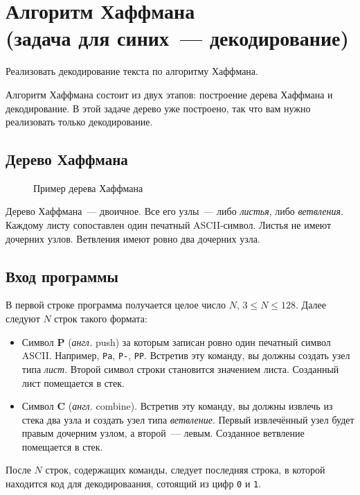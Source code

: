 ﻿\documentclass[a4paper,10pt]{article}
\begin{document}
\section*{Алгоритм Хаффмана\\
(задача для синих~--- декодирование)}

Реализовать декодирование текста по алгоритму Хаффмана.

Алгоритм Хаффмана состоит из двух этапов: построение дерева Хаффмана и декодирование.
В этой задаче дерево уже построено, так что вам нужно реализовать только декодирование.

\subsection*{Дерево Хаффмана}

\begin{figure}[htbp]
    \centering
    
    \caption{Пример дерева Хаффмана}
\end{figure}

Дерево Хаффмана~--- двоичное.
Все его узлы~--- либо \textit{листья}, либо \textit{ветвления}.
Каждому листу сопоставлен один печатный ASCII-символ.
Листья не имеют дочерних узлов.
Ветвления имеют ровно два дочерних узла.

\subsection*{Вход программы}

В первой строке программа получается целое число $N$, $3 \leq N \leq 128$.
Далее следуют $N$ строк такого формата:

\begin{itemize}
    \item Символ \textbf{P} (\textit{англ.} push) за которым записан ровно один печатный символ ASCII. Например, \texttt{Pa}, \texttt{P-}, \texttt{PP}.
    Встретив эту команду, вы должны создать узел типа \textit{лист}.
    Второй символ строки становится значением листа.
    Созданный лист помещается в стек.
    \item Символ \textbf{C} (\textit{англ.} combine).
    Встретив эту команду, вы должны извлечь из стека два узла и создать узел типа \textit{ветвление}.
    Первый извлечённый узел будет правым дочерним узлом, а второй~--- левым.
    Созданное ветвление помещается в стек.
\end{itemize}

После $N$ строк, содержащих команды, следует последняя строка, в которой находится код для декодироваания, сотоящий из цифр \texttt{0} и \texttt{1}.
\end{document}
